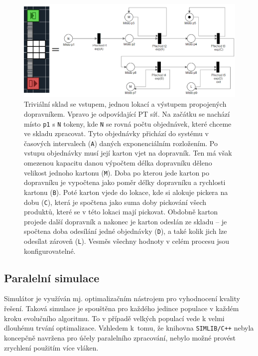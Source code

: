 \begin{figure}[t]
    \centering
    \includegraphics[width=0.71\linewidth]{figures/implementace/PT_wh.png}
    \caption{Triviální sklad se vstupem, jednou lokací a výstupem propojených dopravníkem. Vpravo je odpovídající PT síť. Na začátku se nachází místo \texttt{p1} s \texttt{N} tokeny, kde \texttt{N} se rovná počtu objednávek, které chceme ve skladu zpracovat. Tyto objednávky přichází do systému v časových intervalech (\texttt{A}) daných exponenciálním rozložením. Po vstupu objednávky musí její karton vjet na dopravník. Ten má však omezenou kapacitu danou výpočtem délka dopravníku děleno velikost jednoho kartonu (\texttt{M}). Doba po kterou jede karton po dopravníku je vypočtena jako poměr délky dopravníku a rychlosti kartonu (\texttt{B}). Poté karton vjede do lokace, kde si alokuje pickera na dobu (\texttt{C}), která je spočtena jako suma doby pickování všech produktů, které se v této lokaci mají pickovat. Obdobně karton projede další dopravník a nakonec je karton odeslán ze skladu -- je spočtena doba odesílání jedné objednávky (\texttt{D}), a také kolik jich lze odesílat zároveň (\texttt{L}). Vesměs všechny hodnoty v celém procesu jsou konfigurovatelné.}
    \label{fig:PTsim}
\end{figure}

\subsection{Paralelní simulace}
\label{section:sim_multithreaded}
Simulátor je využíván mj. optimalizačním nástrojem pro vyhodnocení kvality řešení. Taková simulace je spouštěna pro každého jedince populace v každém kroku evolučního algoritmu. To v případě velkých populací vede k velmi dlouhému trvání optimalizace. Vzhledem k~tomu, že knihovna \texttt{SIMLIB/C++} nebyla koncepčně navržena pro účely paralelního zpracování, nebylo možné provést zrychlení použitím více vláken.

